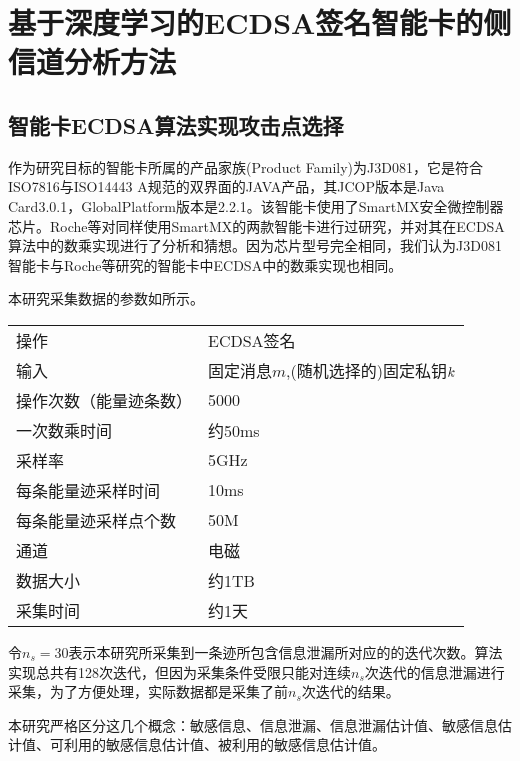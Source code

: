 \chapter{基于深度学习的ECDSA签名智能卡的侧信道分析方法}\label{chap:search2}{
	\section{智能卡ECDSA算法实现攻击点选择}\label{sec:vulnerable}
	
	作为研究目标的智能卡所属的产品家族(Product Family)为J3D081，它是符合ISO7816\citep{ISO/IEC7816}与ISO14443 A\citep{ISO/IEC14443}规范的双界面的JAVA产品，其JCOP版本是Java Card3.0.1，GlobalPlatform版本是2.2.1。该智能卡使用了SmartMX\citep{p5x}安全微控制器芯片。Roche等\citep{Roche21}对同样使用SmartMX的两款智能卡进行过研究，并对其在ECDSA算法中的数乘实现进行了分析和猜想。因为芯片型号完全相同，我们认为J3D081智能卡与Roche等\citep{Roche21}研究的智能卡中ECDSA中的数乘实现也相同。

	本研究采集数据的参数如所示。
	
	\begin{table}[!h]
		\label{tab:acquisitionpara}
		\centering
		\begin{tabular}{ll}
			\hline
			操作 & ECDSA签名\\
			输入 & 固定消息$m$,(随机选择的)固定私钥$k$\\
			操作次数（能量迹条数） & 5000\\
			一次数乘时间 & 约50ms\\
			采样率 & 5GHz\\
			每条能量迹采样时间 & 10ms\\
			每条能量迹采样点个数 & 50M\\
			通道 & 电磁\\
			数据大小 & 约1TB\\
			采集时间 & 约1天\\
			\hline
		\end{tabular}
	\end{table}

	令$n_s=30$表示本研究所采集到一条迹所包含信息泄漏所对应的的迭代次数。算法实现总共有128次迭代，但因为采集条件受限只能对连续$n_s$次迭代的信息泄漏进行采集，为了方便处理，实际数据都是采集了前$n_s$次迭代的结果。
	
	本研究严格区分这几个概念：敏感信息、信息泄漏、信息泄漏估计值、敏感信息估计值、可利用的敏感信息估计值、被利用的敏感信息估计值。
	
}

